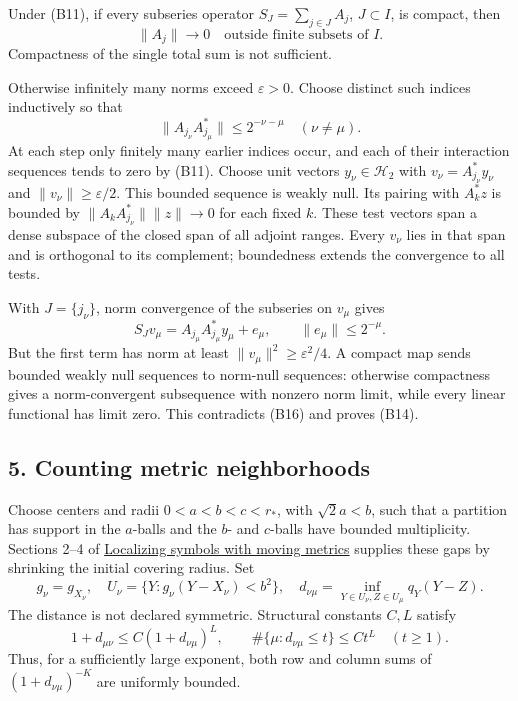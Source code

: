 \documentclass[
  11pt,
]{article}
\begin{document}
Under (B11), if every subseries operator \(S_J=\sum_{j\in J}A_j\),
\(J\subset I\), is compact, then \[
 \|A_j\|\longrightarrow0\quad\text{outside finite subsets of }I.
 \tag{B14}
\] Compactness of the single total sum is not sufficient.

Otherwise infinitely many norms exceed \(\varepsilon>0\). Choose
distinct such indices inductively so that \[
 \|A_{j_\nu}A_{j_\mu}^*\|\le2^{-\nu-\mu}\quad(\nu\ne\mu).
 \tag{B15}
\] At each step only finitely many earlier indices occur, and each of
their interaction sequences tends to zero by (B11). Choose unit vectors
\(y_\nu\in\mathcal H_2\) with \(v_\nu=A_{j_\nu}^*y_\nu\) and
\(\|v_\nu\|\ge\varepsilon/2\). This bounded sequence is weakly null. Its
pairing with \(A_k^*z\) is bounded by \(\|A_kA_{j_\nu}^*\|\|z\|\to0\)
for each fixed \(k\). These test vectors span a dense subspace of the
closed span of all adjoint ranges. Every \(v_\nu\) lies in that span and
is orthogonal to its complement; boundedness extends the convergence to
all tests.

With \(J=\{j_\nu\}\), norm convergence of the subseries on \(v_\mu\)
gives \[
 S_Jv_\mu=A_{j_\mu}A_{j_\mu}^*y_\mu+e_\mu,
 \qquad\|e_\mu\|\le2^{-\mu}.
 \tag{B16}
\] But the first term has norm at least
\(\|v_\mu\|^2\ge\varepsilon^2/4\). A compact map sends bounded weakly
null sequences to norm-null sequences: otherwise compactness gives a
norm-convergent subsequence with nonzero norm limit, while every linear
functional has limit zero. This contradicts (B16) and proves (B14).

\subsection{5. Counting metric
neighborhoods}\label{counting-metric-neighborhoods}

Choose centers and radii \(0<a<b<c<r_*\), with \(\sqrt2a<b\), such that
a partition has support in the \(a\)-balls and the \(b\)- and
\(c\)-balls have bounded multiplicity. Sections 2--4 of
\href{metric-localization.pdf}{Localizing symbols with moving metrics}
supplies these gaps by shrinking the initial covering radius. Set \[
 g_\nu=g_{X_\nu},\quad U_\nu=\{Y:g_\nu(Y-X_\nu)<b^2\},
 \quad d_{\nu\mu}=\inf_{Y\in U_\nu,Z\in U_\mu}q_Y(Y-Z).
 \tag{B17}
\] The distance is not declared symmetric. Structural constants \(C,L\)
satisfy \[
 1+d_{\mu\nu}\le C(1+d_{\nu\mu})^L,
 \qquad\#\{\mu:d_{\nu\mu}\le t\}\le Ct^L\quad(t\ge1).
 \tag{B18}
\] Thus, for a sufficiently large exponent, both row and column sums of
\((1+d_{\nu\mu})^{-K}\) are uniformly bounded.
\end{document}
